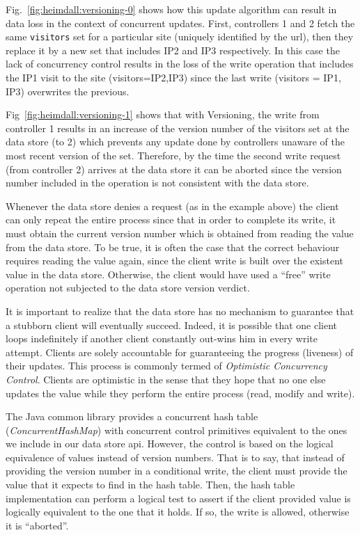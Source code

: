Fig.~\ref{fig:heimdall:versioning-0} shows how this update algorithm can result in data loss in the context of concurrent updates. 
First, controllers 1 and 2 fetch the same \texttt{visitors} set for a particular site (uniquely identified by the \gls{url}), then they replace it by a new set that includes IP2 and IP3 respectively. 
In this case the lack of concurrency control  results in the loss of the write operation that includes the IP1 visit to the site (visitors={IP2,IP3})  since the  last write (visitors = {IP1, IP3}) overwrites the previous. 

Fig~\ref{fig:heimdall:versioning-1} shows that with Versioning, the write from controller 1 results in an increase of the version number of the visitors set at the data store (to 2) which prevents any update done by controllers unaware of the most recent version of the set. 
Therefore, by the time the second write request (from controller 2) arrives at the data store it can be aborted since  the version number included in the operation is not consistent with the data store. 


Whenever the data store denies a request (as in the example above) the client can only repeat the entire process since that in order to complete its write, it must obtain the current version number which is obtained from reading the value from the data store. 
To be true, it is often the case that the correct behaviour requires reading the value again, since the client write is built over the existent value in the data store. 
Otherwise, the client would have used a ``free'' write operation not subjected to the data store version verdict. 


It is important to realize that the data store has no mechanism to guarantee that a stubborn client will eventually succeed.
Indeed, it is possible that one client  loops indefinitely if another client constantly out-wins him in every write attempt. 
Clients are solely accountable for  guaranteeing  the progress (liveness) of their updates. 
This process is commonly termed of \emph{Optimistic Concurrency Control}. Clients are optimistic in the sense that they hope that no one else updates the value while they perform the entire process (read, modify and write). 

The Java common library provides a concurrent hash table (\emph{ConcurrentHashMap}) with concurrent control primitives  equivalent to the ones we include in our data store \gls{api}. 
However, the control is based on the logical equivalence of values instead of version numbers. 
That is to say, that instead of providing the version number in a conditional write, the client must provide the value that it expects to find in the hash table. 
Then, the hash table implementation can perform a logical test to assert if the client provided value is logically equivalent to the one that it holds. If so, the write is allowed, otherwise it is ``aborted''.  

